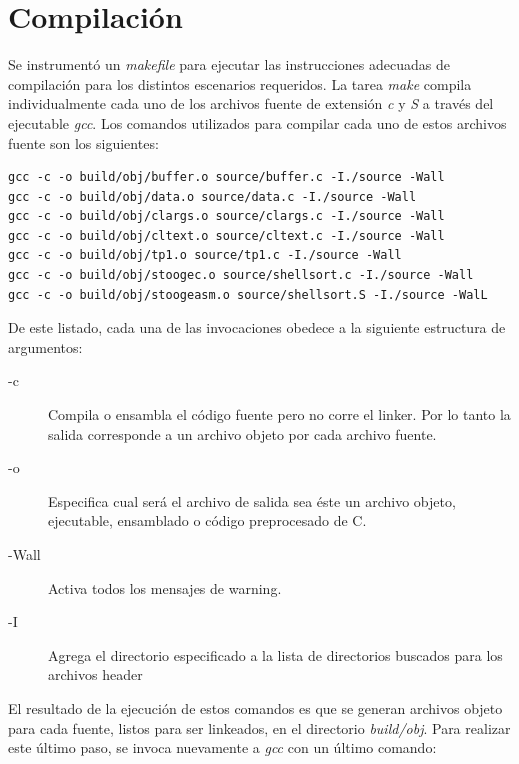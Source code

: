 \documentclass[a4paper,11pt]{article}
\begin{document}
\section{Compilación}

Se instrumentó un \textit{makefile} para ejecutar las instrucciones adecuadas
de compilación para los distintos escenarios requeridos. La
tarea \textit{make} compila individualmente cada uno de los archivos fuente de
extensión \textit{c} y \textit{S} a través del ejecutable \textit{gcc}.
Los comandos utilizados para compilar cada uno de estos archivos fuente son los
siguientes:

\begin{lstlisting}
gcc -c -o build/obj/buffer.o source/buffer.c -I./source -Wall
gcc -c -o build/obj/data.o source/data.c -I./source -Wall
gcc -c -o build/obj/clargs.o source/clargs.c -I./source -Wall
gcc -c -o build/obj/cltext.o source/cltext.c -I./source -Wall
gcc -c -o build/obj/tp1.o source/tp1.c -I./source -Wall
gcc -c -o build/obj/stoogec.o source/shellsort.c -I./source -Wall
gcc -c -o build/obj/stoogeasm.o source/shellsort.S -I./source -WalL
\end{lstlisting}

De este listado, cada una de las invocaciones obedece a la siguiente estructura
de argumentos:

\begin{description}

  \item[-c] Compila o ensambla el código fuente pero no corre el linker.  Por
    lo tanto la salida corresponde a un archivo objeto por cada archivo fuente.

  \item[-o] Especifica cual será el archivo de salida sea éste un archivo
    objeto, ejecutable, ensamblado o código preprocesado de C.

  \item[-Wall] Activa todos los mensajes de warning.

  \item[-I] Agrega el directorio especificado a la lista de directorios
    buscados para los archivos header

\end{description}

El resultado de la ejecución de estos comandos es que se generan archivos
objeto para cada fuente, listos para ser linkeados, en el directorio
\textit{build/obj}. Para realizar este último paso, se invoca nuevamente a
\textit{gcc} con un último comando:
\end{document}
